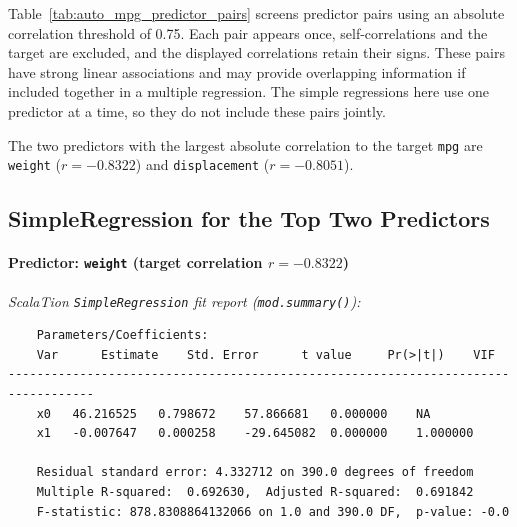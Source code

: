 \documentclass{article}
\begin{document}
Table~\ref{tab:auto_mpg_predictor_pairs} screens predictor pairs using an absolute correlation threshold of 0.75. Each pair appears once, self-correlations and the target are excluded, and the displayed correlations retain their signs. These pairs have strong linear associations and may provide overlapping information if included together in a multiple regression. The simple regressions here use one predictor at a time, so they do not include these pairs jointly.

The two predictors with the largest absolute correlation to the target \texttt{mpg} are \texttt{weight} ($r=-0.8322$) and \texttt{displacement} ($r=-0.8051$).

\subsection{SimpleRegression for the Top Two Predictors}

\paragraph{Predictor: \texttt{weight} (target correlation $r = -0.8322$)}

\textit{ScalaTion \texttt{SimpleRegression} fit report (\texttt{mod.summary()}):}
\begin{verbatim}
    Parameters/Coefficients:
    Var      Estimate    Std. Error 	 t value 	 Pr(>|t|) 	 VIF
----------------------------------------------------------------------------------
    x0	 46.216525	 0.798672	 57.866681	 0.000000	 NA
    x1	 -0.007647	 0.000258	 -29.645082	 0.000000	 1.000000

    Residual standard error: 4.332712 on 390.0 degrees of freedom
    Multiple R-squared:  0.692630,	Adjusted R-squared:  0.691842
    F-statistic: 878.8308864132066 on 1.0 and 390.0 DF,  p-value: -0.0
\end{verbatim}
\end{document}
